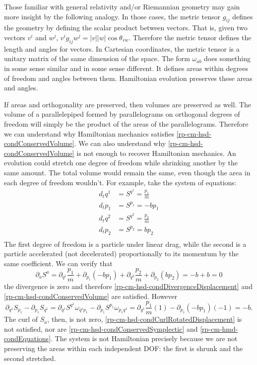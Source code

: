 Those familiar with general relativity and/or Riemannian geometry may gain more insight by the following analogy. In those cases, the metric tensor $g_{ij}$ defines the geometry by defining the scalar product between vectors. That is, given two vectors $v^i$ and $w^j$, $v^i g_{ij} w^j = |v| |w| \cos \theta_{vw}$. Therefore the metric tensor defines the length and angles for vectors. In Cartesian coordinates, the metric tensor is a unitary matrix of the same dimension of the space. The form $\omega_{ab}$ does something in some sense similar and in some sense different. It defines areas within degrees of freedom and angles between them. Hamiltonian evolution preserves these areas and angles.

If areas and orthogonality are preserved, then volumes are preserved as well. The volume of a parallelepiped formed by parallelograms on orthogonal degrees of freedom will simply be the product of the areas of the parallelograms. Therefore we can understand why Hamiltonian mechanics satisfies \ref{rp-cm-hsd-condConservedVolume}. We can also understand why \ref{rp-cm-hsd-condConservedVolume} is not enough to recover Hamiltonian mechanics. An evolution could stretch one degree of freedom while shrinking another by the same amount. The total volume would remain the same, even though the area in each degree of freedom wouldn't. For example, take the system of equations:
\begin{equation}
	\begin{aligned}
	d_t q^1 &= S^{q^1} = \frac{p_1}{m} \\
	d_t p_1 &= S^{p_1} = - b p_1 \\
	d_t q^2 &= S^{q^2} = \frac{p_2}{m} \\
	d_t p_2 &= S^{p_2} = b p_2 \\
	\end{aligned}
\end{equation}
The first degree of freedom is a particle under linear drag, while the second is a particle accelerated (not decelerated) proportionally to its momentum by the same coefficient. We can verify that
\begin{equation}
	\partial_a S^a = \partial_{q^1} \frac{p_1}{m} + \partial_{p_1} (-b p_1) + \partial_{q^2} \frac{p_2}{m} + \partial_{p_2} (b p_2) = - b +b = 0
\end{equation}
the divergence is zero and therefore \ref{rp-cm-hsd-condDivergenceDisplacement} and \ref{rp-cm-hsd-condConservedVolume} are satisfied. However
\begin{equation}
	\partial_{q^1} S_{p_1} - \partial_{p_1} S_{q^1} = \partial_{q^1} S^{q^1} \omega_{q^1 p_1} - \partial_{p_1} S^{p_1} \omega_{p_1 q^1} = \partial_{q^1} \frac{p_1}{m} (1) - \partial_{p_1} (-b p_1) (-1) = -b.
\end{equation}
The curl of $S_a$, then, is not zero, \ref{rp-cm-hsd-condCurlRotatedDisplacement} is not satisfied, nor are \ref{rp-cm-hsd-condConservedSymplectic} and \ref{rp-cm-hmd-condEquations}. The system is not Hamiltonian precisely because we are not preserving the areas within each independent DOF: the first is shrunk and the second stretched.

